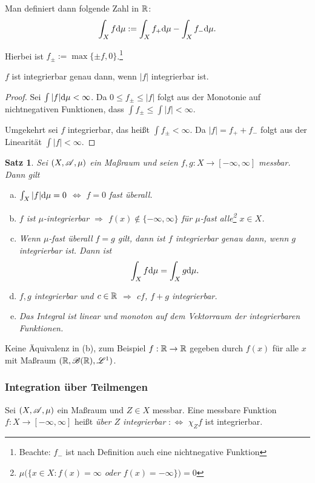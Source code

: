 \documentclass[
 a4paper,
 12pt,
 parskip=half
 ]{scrartcl}
\theoremstyle{plain}
\newtheorem*{thm*}{Satz}
\theoremstyle{definition}
\numberwithin{equation}{section}
\begin{document}
Man definiert dann folgende Zahl in $\mathbb{R}$:
\[ \int_X f \mathrm{d} \mu := \int_X f_+ \mathrm{d} \mu - \int_X f_- \mathrm{d} \mu. \]

Hierbei ist $f_\pm := \max \{ \pm f, 0 \}$.\footnote{Beachte: $f_-$ ist nach Definition auch eine nichtnegative Funktion}

\begin{bem}
 $f$ ist integrierbar genau dann, wenn $|f|$ integrierbar ist.
 \begin{proof}
  Sei $\int |f| \mathrm{d} \mu < \infty$. Da $0 \le f_\pm \le |f|$ folgt aus der Monotonie auf nichtnegativen Funktionen, dass $\int f_\pm \le \int |f| < \infty$.
  
  Umgekehrt sei $f$ integrierbar, das heißt $\int f_\pm < \infty$. Da $|f| = f_+ + f_-$ folgt aus der Linearität $\int |f| < \infty$.
 \end{proof}
\end{bem}

\begin{thm*}
 Sei $(X,\mathscr{A},\mu)$ ein Maßraum und seien $f,g:X \to [-\infty, \infty]$ messbar. Dann gilt
 \begin{enumerate}[(a)]
  \item $\int_X |f| \mathrm{d} \mu = 0$ $\Leftrightarrow$ $f=0$ fast überall.
  \item $f$ ist $\mu$-integrierbar $\Rightarrow$ $f(x) \notin \{ -\infty, \infty \}$ für $\mu$-fast alle\footnote{$\mu(\{ x \in X: f(x) = \infty$ oder $f(x) = -\infty \} ) = 0$} $x \in X$.
  \item Wenn $\mu$-fast überall $f=g$ gilt, dann ist $f$ integrierbar genau dann, wenn $g$ integrierbar ist. Dann ist
  \[ \int_X f \mathrm{d} \mu = \int_X g \mathrm{d} \mu. \]
  \item $f,g$ integrierbar und $c \in \mathbb{R}$ $\Rightarrow$ $cf$, $f+g$ integrierbar.
  \item Das Integral ist linear und monoton auf dem Vektorraum der integrierbaren Funktionen.
 \end{enumerate}
\end{thm*}

\begin{bem}
 Keine Äquivalenz in (b), zum Beispiel $f: \mathbb{R} \to \mathbb{R}$ gegeben durch $f(x)$ für alle $x$ mit Maßraum $(\mathbb{R}, \mathscr{B}(\mathbb{R}), \mathscr{L}^1 )$.
\end{bem}

\subsubsection{Integration über Teilmengen}
 Sei $(X,\mathscr{A},\mu)$ ein Maßraum und $Z \in X$ messbar. Eine messbare Funktion $f:X \to [-\infty,\infty]$ heißt \emph{über $Z$ integrierbar} $:\Leftrightarrow$ $\chi_Z f$ ist integrierbar. 
 
\end{document}

